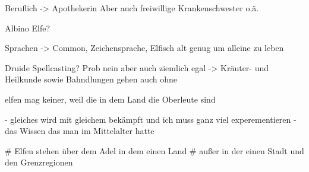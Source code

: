 Beruflich -> Apothekerin
Aber auch freiwillige Krankenschwester o.ä.

Albino Elfe?

Sprachen -> Common, Zeichensprache, Elfisch
alt genug um alleine zu leben

Druide Spellcasting?
Prob nein aber auch ziemlich egal
    -> Kräuter- und Heilkunde sowie Bahndlungen gehen auch ohne

elfen mag keiner, weil die in dem Land die Oberleute sind

- gleiches wird mit gleichem bekämpft und ich muss ganz viel experementieren
- das Wissen das man im Mittelalter hatte 

# Elfen stehen über dem Adel in dem einen Land
# außer in der einen Stadt und den Grenzregionen